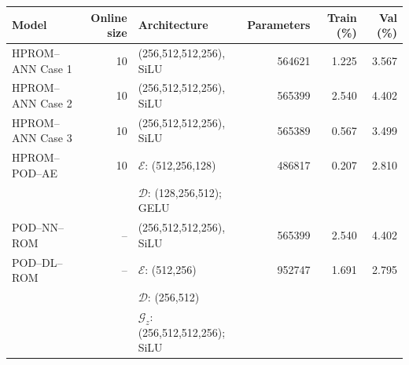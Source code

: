 \begin{tabular}{lrlr|rr}
\toprule
Model & Online size & Architecture & Parameters & Train (\%) & Val (\%) \\
\midrule
HPROM--ANN Case 1 & 10 & (256,512,512,256), SiLU & 564621 & 1.225 & 3.567 \\
HPROM--ANN Case 2 & 10 & (256,512,512,256), SiLU & 565399 & 2.540 & 4.402 \\
HPROM--ANN Case 3 & 10 & (256,512,512,256), SiLU & 565389 & 0.567 & 3.499 \\
HPROM--POD--AE & 10 & $\mathcal E$: (512,256,128) & 486817 & 0.207 & 2.810 \\
 &  & $\mathcal D$: (128,256,512); GELU &  &  &  \\
\midrule
POD--NN--ROM & -- & (256,512,512,256), SiLU & 565399 & 2.540 & 4.402 \\
POD--DL--ROM & -- & $\mathcal E$: (512,256) & 952747 & 1.691 & 2.795 \\
 &  & $\mathcal D$: (256,512) &  &  &  \\
 &  & $\mathcal G_z$: (256,512,512,256); SiLU &  &  &  \\
\bottomrule
\end{tabular}
